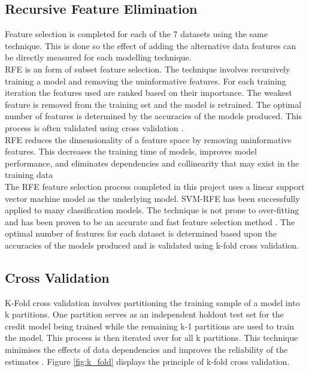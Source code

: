 \vspace{10 pt}


\subsection{Recursive Feature Elimination}

Feature selection is completed for each of the 7 datasets using the same technique. This is done so the effect of adding the alternative data features can be directly measured for each modelling technique. \\

RFE is an form of subset feature selection. The technique involves recursively training a model and removing the uninformative features. For each training iteration the features used are ranked based on their importance. The weakest feature is removed from the training set and the model is retrained. The optimal number of features is determined by the accuracies of the models produced. This process is often validated using cross validation \parencite{RFE}. \\

RFE reduces the dimensionality of a feature space by removing uninformative features. This decreases the training time of models, improves model performance, and eliminates dependencies and collinearity that may exist in the training data \parencite{RFE} \\

The RFE feature selection process completed in this project uses a linear support vector machine model as the underlying model. SVM-RFE has been successfully applied to many classification models. The technique is not prone to over-fitting and has been proven to be an accurate and fast feature selection method \parencite{svm_rfe}. The optimal number of features for each dataset is determined based upon the accuracies of the models produced and is validated using k-fold cross validation. 

\subsection{Cross Validation}

K-Fold cross validation involves partitioning the training sample of a model into k partitions. One partition serves as an independent holdout test set for the credit model being trained while the remaining k-1 partitions are used to train the model. This process is then iterated over for all k partitions. This technique minimises the effects of data dependencies and improves the reliability of the estimates \parencite{k_fold}. Figure \ref{fig:k_fold} displays the principle of k-fold cross validation. 

